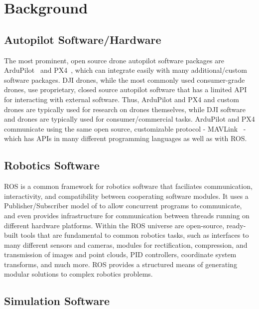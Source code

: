 \section{Background}

\subsection{Autopilot Software/Hardware}

The most prominent, open source drone autopilot software packages are ArduPilot~\cite{ardupilot_website} and PX4~\cite{pixhawk_website},
which can integrate easily with many additional/custom software packages.
DJI drones, while the most commonly used consumer-grade drones, use proprietary, closed source autopilot software
that has a limited API for interacting with external software.
Thus, ArduPilot and PX4 and custom drones are typically used for research on drones themselves,
while DJI software and drones are typically used for consumer/commercial tasks.
ArduPilot and PX4 communicate using the same open source, customizable protocol - MAVLink~\cite{mavlink_io} -
which has APIs in many different programming languages as well as with ROS.

\subsection{Robotics Software}

ROS is a common framework for robotics software that faciliates communication, interactivity, and compatibility
between cooperating software modules.
It uses a Publisher/Subscriber model of to allow concurrent programs to communicate,
and even provides infrastructure for communication between threads running on different hardware platforms.
Within the ROS universe are open-source, ready-built tools that are fundamental to common robotics tasks,
such as interfaces to many different sensors and cameras,
modules for rectification, compression, and transmission of images and point clouds,
PID controllers,
coordinate system transforms,
and much more.
ROS provides a structured means of generating modular solutions to complex robotics problems.

\subsection{Simulation Software}

